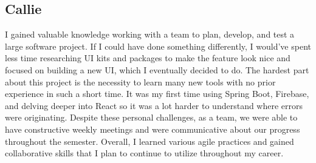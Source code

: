 \subsection{Callie}
I gained valuable knowledge working with a team to plan, develop, and test a large software project. If I could have done something differently, I would've spent less time researching UI kits and packages to make the feature look nice and focused on building a new UI, which I eventually decided to do. The hardest part about this project is the necessity to learn many new tools with no prior experience in such a short time. It was my first time using Spring Boot, Firebase, and delving deeper into React so it was a lot harder to understand where errors were originating. Despite these personal challenges, as a team, we were able to have constructive weekly meetings and were communicative about our progress throughout the semester. Overall, I learned various agile practices and gained collaborative skills that I plan to continue to utilize throughout my career.

